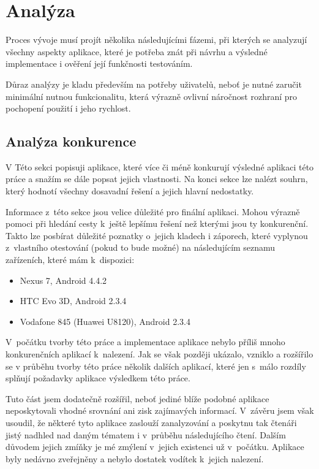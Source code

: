 \documentclass[thesis=B,czech]{FITthesis}[2013/10/20]
\begin{document}
\chapter{Analýza}

Proces vývoje musí projít několika následujícími fázemi, při kterých se analyzují všechny aspekty aplikace, které je potřeba znát při návrhu a výsledné implementace i ověření její funkčnosti testováním.

Důraz analýzy je kladu především na potřeby uživatelů, neboť je nutné zaručit minimální nutnou funkcionalitu, která výrazně ovlivní náročnost rozhraní pro pochopení použití i jeho rychlost.

\section{Analýza konkurence}

V Této sekci popisuji aplikace, které více či méně konkurují výsledné aplikaci této práce a snažím se dále popsat jejich vlastnosti. Na konci sekce lze nalézt souhrn, který hodnotí všechny dosavadní řešení a jejich hlavní nedostatky.

Informace z~této sekce jsou velice důležité pro finální aplikaci. Mohou výrazně pomoci při hledání cesty k~ještě lepšímu řešení než kterými jsou ty konkurenční. Takto lze posbírat důležité poznatky o~jejich kladech i záporech, které vyplynou z~vlastního otestování (pokud to bude možné) na následujícím seznamu zařízeních, které mám k~dispozici:
\begin{itemize}
  \item{Nexus 7, Android 4.4.2}
  \item{HTC Evo 3D, Android 2.3.4}
  \item{Vodafone 845 (Huawei U8120), Android 2.3.4}
\end{itemize}

V~počátku tvorby této práce a implementace aplikace nebylo příliš mnoho konkurenčních aplikací k~nalezení. Jak se však později ukázalo, vzniklo a rozšířilo se v průběhu tvorby této práce několik dalších aplikací, které jen s~málo rozdíly splňují požadavky aplikace výsledkem této práce.

Tuto část jsem dodatečně rozšířil, neboť jediné blíže podobné aplikace neposkytovali vhodné srovnání ani zisk zajímavých informací. V~závěru jsem však usoudil, že některé tyto aplikace zaslouží zanalyzování a poskytnu tak čtenáři jistý nadhled nad daným tématem i v~průběhu následujícího čtení. Dalším důvodem jejich zmíňky je mé zmýlení v~jejich existenci už v~počátku. Aplikace byly nedávno zveřejněny a nebylo dostatek vodítek k~jejich nalezení.
\end{document}
